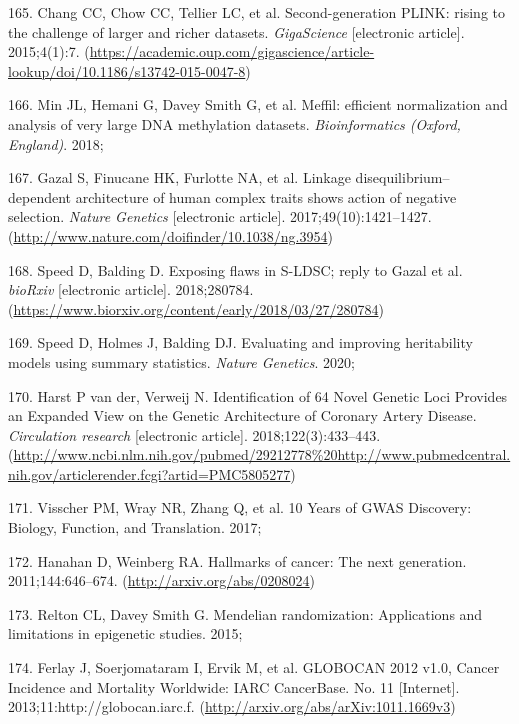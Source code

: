 \documentclass[11pt,oneside]{bristolthesis}
\newenvironment{cslreferences}%
  {}%
  {\par}
\begin{document}
\begin{cslreferences}
\leavevmode\hypertarget{ref-Chang2015}{}%
165. Chang CC, Chow CC, Tellier LC, et al. Second-generation PLINK: rising to the challenge of larger and richer datasets. \emph{GigaScience} {[}electronic article{]}. 2015;4(1):7. (\url{https://academic.oup.com/gigascience/article-lookup/doi/10.1186/s13742-015-0047-8})

\leavevmode\hypertarget{ref-Min2018}{}%
166. Min JL, Hemani G, Davey Smith G, et al. Meffil: efficient normalization and analysis of very large DNA methylation datasets. \emph{Bioinformatics (Oxford, England)}. 2018;

\leavevmode\hypertarget{ref-Gazal2017}{}%
167. Gazal S, Finucane HK, Furlotte NA, et al. Linkage disequilibrium--dependent architecture of human complex traits shows action of negative selection. \emph{Nature Genetics} {[}electronic article{]}. 2017;49(10):1421--1427. (\url{http://www.nature.com/doifinder/10.1038/ng.3954})

\leavevmode\hypertarget{ref-Speed2018}{}%
168. Speed D, Balding D. Exposing flaws in S-LDSC; reply to Gazal et al. \emph{bioRxiv} {[}electronic article{]}. 2018;280784. (\url{https://www.biorxiv.org/content/early/2018/03/27/280784})

\leavevmode\hypertarget{ref-Speed2020}{}%
169. Speed D, Holmes J, Balding DJ. Evaluating and improving heritability models using summary statistics. \emph{Nature Genetics}. 2020;

\leavevmode\hypertarget{ref-VanderHarst2018}{}%
170. Harst P van der, Verweij N. Identification of 64 Novel Genetic Loci Provides an Expanded View on the Genetic Architecture of Coronary Artery Disease. \emph{Circulation research} {[}electronic article{]}. 2018;122(3):433--443. (\url{http://www.ncbi.nlm.nih.gov/pubmed/29212778\%20http://www.pubmedcentral.nih.gov/articlerender.fcgi?artid=PMC5805277})

\leavevmode\hypertarget{ref-Visscher2017}{}%
171. Visscher PM, Wray NR, Zhang Q, et al. 10 Years of GWAS Discovery: Biology, Function, and Translation. 2017;

\leavevmode\hypertarget{ref-Hanahan2011}{}%
172. Hanahan D, Weinberg RA. Hallmarks of cancer: The next generation. 2011;144:646--674. (\url{http://arxiv.org/abs/0208024})

\leavevmode\hypertarget{ref-Relton2015}{}%
173. Relton CL, Davey Smith G. Mendelian randomization: Applications and limitations in epigenetic studies. 2015;

\leavevmode\hypertarget{ref-Ferlay2013}{}%
174. Ferlay J, Soerjomataram I, Ervik M, et al. GLOBOCAN 2012 v1.0, Cancer Incidence and Mortality Worldwide: IARC CancerBase. No. 11 {[}Internet{]}. 2013;11:http://globocan.iarc.f. (\url{http://arxiv.org/abs/arXiv:1011.1669v3})


\end{cslreferences}
\end{document}
